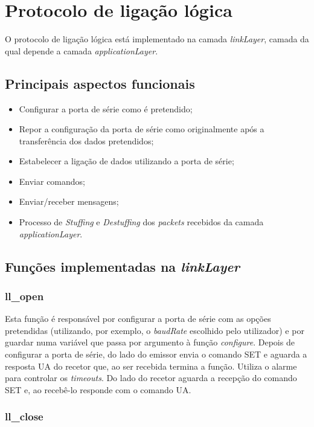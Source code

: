 \documentclass[11pt]{article}
\begin{document}
\section{Protocolo de ligação lógica}

O protocolo de ligação lógica está implementado na camada \textit{linkLayer}, camada da qual depende a camada \textit{applicationLayer}.

\subsection{Principais aspectos funcionais}
\begin{itemize}
  \item Configurar a porta de série como é pretendido;
  \item Repor a configuração da porta de série como originalmente após a transferência dos dados pretendidos;
  \item  Estabelecer a ligação de dados utilizando a porta de série;
  \item  Enviar comandos;
  \item  Enviar/receber mensagens;
  \item Processo de \textit{Stuffing} e \textit{Destuffing} dos \textit{packets} recebidos da camada \textit{applicationLayer}.
\end{itemize}


\subsection{Funções implementadas na \textit{linkLayer}}
  
 \subsubsection{ll\_open}

	Esta função é responsável por configurar a porta de série com as opções pretendidas (utilizando, por exemplo, o \textit{baudRate} escolhido pelo utilizador) e por guardar numa variável que passa por argumento à função \textit{configure}.
	Depois de configurar a porta de série, do lado do emissor envia o comando SET e aguarda a resposta UA do recetor que, ao ser recebida termina a função. Utiliza o alarme para controlar os \textit{timeouts}. Do lado do recetor aguarda a recepção do comando SET e, ao recebê-lo responde com o comando UA.
   	
  \subsubsection{ll\_close}
   
\end{document}
